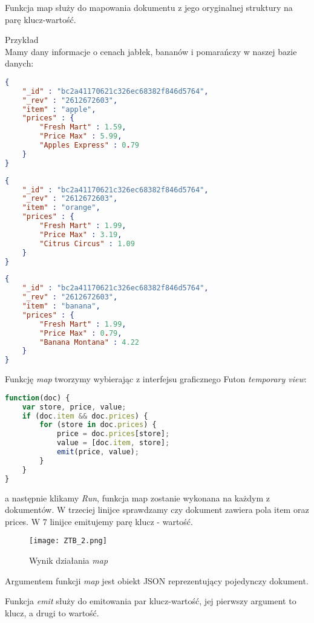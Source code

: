 \documentclass[a4paper,15pt]{article}
\newcommand{\issue}[2]{
    \begin{tcolorbox}[colback=issueColor!5!white,colframe=issueColor,title={Pamiętaj #1}]
        #2
    \end{tcolorbox}
}
\begin{document}
\issue{}{
Funkcja map służy do mapowania dokumentu z jego oryginalnej struktury na parę klucz-wartość. 
}

Przykład \\

Mamy dany informacje o cenach jabłek, bananów i pomarańczy w naszej bazie danych:

\begin{lstlisting}[language=json,firstnumber=1]
{
	"_id" : "bc2a41170621c326ec68382f846d5764",
	"_rev" : "2612672603",
	"item" : "apple",
	"prices" : {
		"Fresh Mart" : 1.59,
		"Price Max" : 5.99,
		"Apples Express" : 0.79
	}
}
\end{lstlisting}

\begin{lstlisting}[language=json,firstnumber=1]
{
	"_id" : "bc2a41170621c326ec68382f846d5764",
	"_rev" : "2612672603",
	"item" : "orange",
	"prices" : {
		"Fresh Mart" : 1.99,
		"Price Max" : 3.19,
		"Citrus Circus" : 1.09
	}
}
\end{lstlisting}


\begin{lstlisting}[language=json,firstnumber=1]
{
	"_id" : "bc2a41170621c326ec68382f846d5764",
	"_rev" : "2612672603",
	"item" : "banana",
	"prices" : {
		"Fresh Mart" : 1.99,
		"Price Max" : 0.79,
		"Banana Montana" : 4.22
	}
}
\end{lstlisting}

Funkcję \textit{map} tworzymy wybierając z interfejsu graficznego Futon \textit{temporary view}:
\begin{lstlisting}[language=JavaScript, caption=Funkcja map emitujaca pary klucz:cena - wartosc: owoc sklep  ]
function(doc) {
	var store, price, value;
	if (doc.item && doc.prices) {
		for (store in doc.prices) {
			price = doc.prices[store];
			value = [doc.item, store];
			emit(price, value);
		}
	}
}
\end{lstlisting}
a następnie klikamy \textit{Run}, funkcja map zostanie wykonana na każdym z dokumentów. W trzeciej linijce sprawdzamy czy dokument zawiera pola item oraz prices. W 7 linijce emitujemy parę klucz - wartość.

\begin{figure}[H]
\centering
  \texttt{[image: ZTB\_2.png]}
  \caption{Wynik działania \textit{map}}
\end{figure}

\issue{}{
Argumentem funkcji \textit{map} jest obiekt JSON reprezentujący pojedynczy dokument.  
}

\issue{}{
Funkcja \textit{emit} służy do emitowania par klucz-wartość, jej pierwszy argument to klucz, a drugi to wartość. 
}
\end{document}

